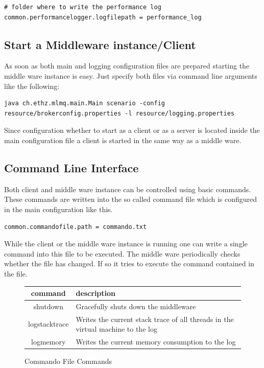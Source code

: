 \documentclass[a4paper]{article}
\begin{document}
\begin{verbatim} 
# folder where to write the performance log
common.performancelogger.logfilepath = performance_log
\end{verbatim}

\subsection{Start a Middleware instance/Client}
As soon as both main and logging configuration files are prepared starting the middle ware instance is easy. Just specify both files via command line arguments like the following:

\begin{verbatim} 
java ch.ethz.mlmq.main.Main scenario -config resource/brokerconfig.properties -l resource/logging.properties
\end{verbatim}

Since configuration whether to start as a client or as a server is located inside the main configuration file a client is started in the same way as a middle ware.

\subsection{Command Line Interface}

Both client and middle ware instance can be controlled using basic commands. These commands are written into the so called command file which is configured in the main configuration like this.

\begin{verbatim}
common.commandofile.path = commando.txt
\end{verbatim}

While the client or the middle ware instance is running one can write a single command into this file to be executed. The middle ware periodically checks whether the file has changed. If so it tries to execute the command contained in the file.

\begin{figure}[H]
  \begin{center}
\begin{tabular}{|c|l|}
\hline 
command & description \\ 
\hline 
shutdown & Gracefully shuts down the middleware \\ 
logstacktrace & Writes the current stack trace of all threads in the virtual machine to the log \\ 
logmemory & Writes the current memory consumption to the log \\ 
\hline
\end{tabular} 
  \end{center}
  \caption{Commando File Commands}
\end{figure}
\end{document}
